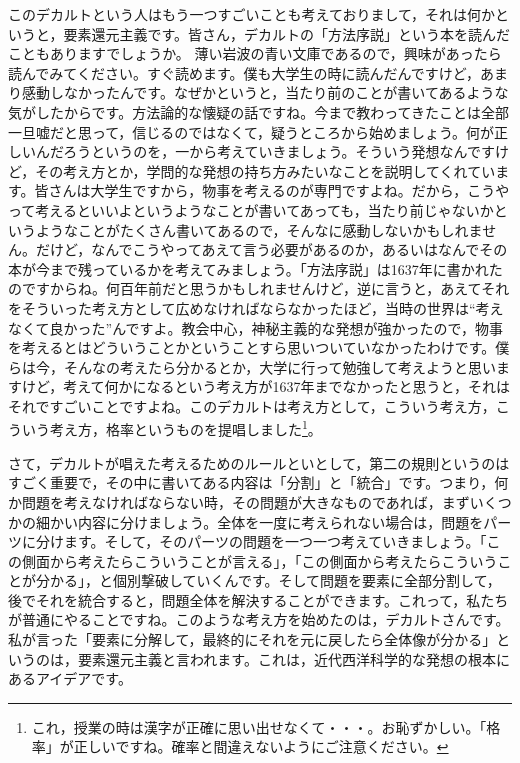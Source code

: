 \documentclass{ltjsbook}
\begin{document}
このデカルトという人はもう一つすごいことも考えておりまして，それは何かというと，要素還元主義です。皆さん，デカルトの「方法序説」という本を読んだこともありますでしょうか\parencite{Descartes}。
薄い岩波の青い文庫であるので，興味があったら読んでみてください。すぐ読めます。僕も大学生の時に読んだんですけど，あまり感動しなかったんです。なぜかというと，当たり前のことが書いてあるような気がしたからです。方法論的な懐疑の話ですね。今まで教わってきたことは全部一旦嘘だと思って，信じるのではなくて，疑うところから始めましょう。何が正しいんだろうというのを，一から考えていきましょう。そういう発想なんですけど，その考え方とか，学問的な発想の持ち方みたいなことを説明してくれています。皆さんは大学生ですから，物事を考えるのが専門ですよね。だから，こうやって考えるといいよというようなことが書いてあっても，当たり前じゃないかというようなことがたくさん書いてあるので，そんなに感動しないかもしれません。だけど，なんでこうやってあえて言う必要があるのか，あるいはなんでその本が今まで残っているかを考えてみましょう。「方法序説」は1637年に書かれたのですからね。何百年前だと思うかもしれませんけど，逆に言うと，あえてそれをそういった考え方として広めなければならなかったほど，当時の世界は``考えなくて良かった''んですよ。教会中心，神秘主義的な発想が強かったので，物事を考えるとはどういうことかということすら思いついていなかったわけです。僕らは今，そんなの考えたら分かるとか，大学に行って勉強して考えようと思いますけど，考えて何かになるという考え方が1637年までなかったと思うと，それはそれですごいことですよね。このデカルトは考え方として，こういう考え方，こういう考え方，格率というものを提唱しました\footnote{これ，授業の時は漢字が正確に思い出せなくて・・・。お恥ずかしい。「格率」が正しいですね。確率と間違えないようにご注意ください。}。

さて，デカルトが唱えた考えるためのルールといとして，第二の規則というのはすごく重要で，その中に書いてある内容は「分割」と「統合」です。つまり，何か問題を考えなければならない時，その問題が大きなものであれば，まずいくつかの細かい内容に分けましょう。全体を一度に考えられない場合は，問題をパーツに分けます。そして，そのパーツの問題を一つ一つ考えていきましょう。「この側面から考えたらこういうことが言える」，「この側面から考えたらこういうことが分かる」，と個別撃破していくんです。そして問題を要素に全部分割して，後でそれを統合すると，問題全体を解決することができます。これって，私たちが普通にやることですね。このような考え方を始めたのは，デカルトさんです。私が言った「要素に分解して，最終的にそれを元に戻したら全体像が分かる」というのは，要素還元主義と言われます。これは，近代西洋科学的な発想の根本にあるアイデアです。
\end{document}
